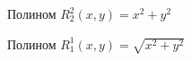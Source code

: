 \documentclass[oneside, final, 14pt]{article}
\begin{document}
\begin{figure}[h]
\caption{Полином $R_2^2(x,y) = x^2 + y^2$}
\end{figure}

\begin{figure}
\caption{Полином $R_1^1(x,y) = \sqrt{x^2 + y^2}$}
\end{figure}
\end{document}
